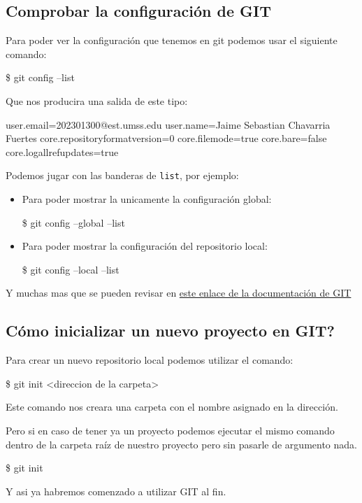     \subsection{Comprobar la configuraci\'on de GIT}
        Para poder ver la configuraci\'on que tenemos en git podemos usar el siguiente comando:
            \begin{lstlistings}
                \$ git config --list
            \end{lstlistings}
        Que nos producira una salida de este tipo:
            \begin{lstlistings}
                user.email=202301300@est.umss.edu
                user.name=Jaime Sebastian Chavarria Fuertes
                core.repositoryformatversion=0
                core.filemode=true
                core.bare=false
                core.logallrefupdates=true
            \end{lstlistings}
        Podemos jugar con las banderas de \texttt{list}, por ejemplo:
            \begin{itemize}
                \item Para poder mostrar la unicamente la configuraci\'on global:
                    \begin{lstlistings}
                        \$ git config --global --list
                    \end{lstlistings}
                \item Para poder mostrar la configuraci\'on del repositorio local:
                    \begin{lstlistings}
                        \$ git config --local --list
                    \end{lstlistings}
            \end{itemize}
        Y muchas mas que se pueden revisar en \href{https://git-scm.com/docs/git-config}{este enlace de la documentaci\'on de GIT}
    
    \subsection{C\'omo inicializar un nuevo proyecto en GIT?}
        Para crear un nuevo repositorio local podemos utilizar el comando:
            \begin{lstlistings}
                \$ git init <direccion de la carpeta>
            \end{lstlistings}
        Este comando nos creara una carpeta con el nombre asignado en la direcci\'on.

        Pero si en caso de tener ya un proyecto podemos ejecutar el mismo comando dentro de la carpeta ra\'iz de nuestro proyecto pero sin pasarle de argumento nada.
            \begin{lstlistings}
                \$ git init
            \end{lstlistings}
        Y asi ya habremos comenzado a utilizar GIT al fin.